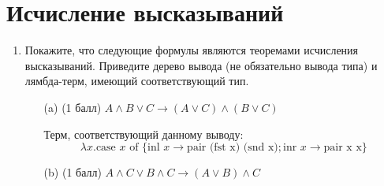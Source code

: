 \section{Исчисление высказываний}
\begin{enumerate}
  \item Покажите, что следующие формулы являются теоремами исчисления высказываний. Приведите дерево вывода (не обязательно вывода типа) и лямбда-терм, имеющий соответствующий тип.
  \begin{itemize}
    \item[(a)] (1 балл) $A \land B \lor C \rightarrow (A \lor C) \land (B \lor C)$
    \begin{solution}
      \hspace{0.01cm}
      \begin{prooftree}
      \end{prooftree}
      Терм, соответствующий данному выводу:
      \begin{equation}
        \lambda x. \text{case } x \text{ of } \{\text{inl } x \rightarrow \text{pair (fst x) (snd x)}; \text{inr } x \rightarrow \text{pair x x}\}
      \end{equation}
    \end{solution}
    \item[(b)] (1 балл) $A \land C \lor B \land C \rightarrow (A \lor B) \land C$
    \begin{solution}
      \hspace{0.01cm}
      \begin{prooftree}

\end{prooftree}
\end{solution}
\end{itemize}
\end{enumerate}
